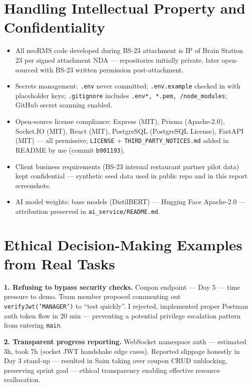 \section{Handling Intellectual Property and Confidentiality}

\begin{itemize}
\item All neoRMS code developed during BS-23 attachment is IP of Brain Station 23 per signed attachment NDA --- repositories initially private, later open-sourced with BS-23 written permission post-attachment.
\item Secrets management: \texttt{.env} never committed; \texttt{.env.example} checked in with placeholder keys; \texttt{.gitignore} includes \texttt{.env*, *.pem, /node\_modules}; GitHub secret scanning enabled.
\item Open-source license compliance: Express (MIT), Prisma (Apache-2.0), Socket.IO (MIT), React (MIT), PostgreSQL (PostgreSQL License), FastAPI (MIT) --- all permissive; \texttt{LICENSE} + \texttt{THIRD\_PARTY\_NOTICES.md} added in README by me (commit \texttt{b901193}).
\item Client business requirements (BS-23 internal restaurant partner pilot data) kept confidential --- synthetic seed data used in public repo and in this report screenshots.
\item AI model weights: base models (DistilBERT) --- Hugging Face Apache-2.0 --- attribution preserved in \texttt{ai\_service/README.md}.
\end{itemize}

\section{Ethical Decision-Making Examples from Real Tasks}

\textbf{1. Refusing to bypass security checks.} Coupon endpoint --- Day 5 --- time pressure to demo. Team member proposed commenting out \texttt{verifyJwt('MANAGER')} to ``test quickly''. I rejected, implemented proper Postman auth token flow in 20 min --- preventing a potential privilege escalation pattern from entering \texttt{main}.

\textbf{2. Transparent progress reporting.} WebSocket namespace auth --- estimated 3h, took 7h (socket JWT handshake edge cases). Reported slippage honestly in Day 3 stand-up --- resulted in Saim taking over coupon CRUD unblocking, preserving sprint goal --- ethical transparency enabling effective resource reallocation.

